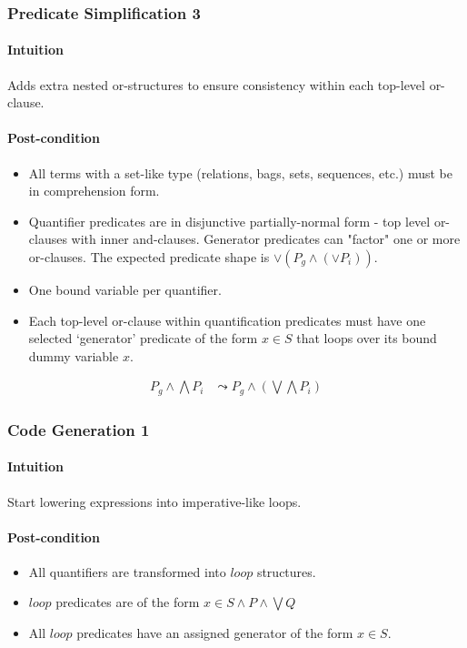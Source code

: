 \documentclass{article}
\begin{document}
\subsubsection{Predicate Simplification 3}

\paragraph{Intuition} Adds extra nested or-structures to ensure consistency within each top-level or-clause.

\paragraph{Post-condition}
\begin{itemize}
  \item All terms with a set-like type (relations, bags, sets, sequences, etc.) must be in comprehension form.
  \item Quantifier predicates are in disjunctive partially-normal form - top level or-clauses with inner and-clauses. Generator predicates can "factor" one or more or-clauses. The expected predicate shape is $\lor(P_g \land (\lor P_i))$.
  \item One bound variable per quantifier.
  \item Each top-level or-clause within quantification predicates must have one selected `generator' predicate of the form $x \in S$ that loops over its bound dummy variable $x$.
\end{itemize}

\noindent\begin{minipage}{\linewidth}
\begin{align}
  \tag{Partially-normalized Disjunctive Form}
  P_g \land \bigwedge P_i
  &\leadsto
  P_g \land (\bigvee \bigwedge P_i)
\end{align}
\end{minipage}

\subsubsection{Code Generation 1}

\paragraph{Intuition} Start lowering expressions into imperative-like loops.

\paragraph{Post-condition}
\begin{itemize}
  \item All quantifiers are transformed into $loop$ structures.
  \item $loop$ predicates are of the form $x \in S \land P \land \bigvee Q$
  \item All $loop$ predicates have an assigned generator of the form $x \in S$.
\end{itemize}
\end{document}
